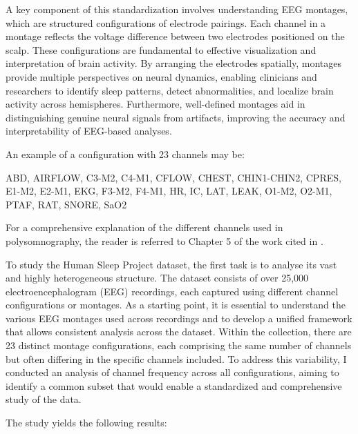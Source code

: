 A key component of this standardization involves understanding EEG montages, which are structured configurations of electrode pairings. Each channel in a montage reflects the voltage difference between two electrodes positioned on the scalp. These configurations are fundamental to effective visualization and interpretation of brain activity. By arranging the electrodes spatially, montages provide multiple perspectives on neural dynamics, enabling clinicians and researchers to identify sleep patterns, detect abnormalities, and localize brain activity across hemispheres. Furthermore, well-defined montages aid in distinguishing genuine neural signals from artifacts, improving the accuracy and interpretability of EEG-based analyses.

An example of a configuration with 23 channels may be:

ABD, AIRFLOW, C3-M2, C4-M1, CFLOW, CHEST, CHIN1-CHIN2, CPRES, E1-M2, E2-M1, EKG, F3-M2, F4-M1, HR, IC, LAT, LEAK, O1-M2, O2-M1, PTAF, RAT, SNORE, SaO2

For a comprehensive explanation of the different channels used in polysomnography, the reader is referred to Chapter 5 of the work cited in \cite{channels}.

To study the Human Sleep Project dataset, the first task is to analyse its vast and highly heterogeneous structure. The dataset consists of over 25,000 electroencephalogram (EEG) recordings, each captured using different channel configurations or montages. As a starting point, it is essential to understand the various EEG montages used across recordings and to develop a unified framework that allows consistent analysis across the dataset. Within the collection, there are 23 distinct montage configurations, each comprising the same number of channels but often differing in the specific channels included. To address this variability, I conducted an analysis of channel frequency across all configurations, aiming to identify a common subset that would enable a standardized and comprehensive study of the data.

The study yields the following results:

